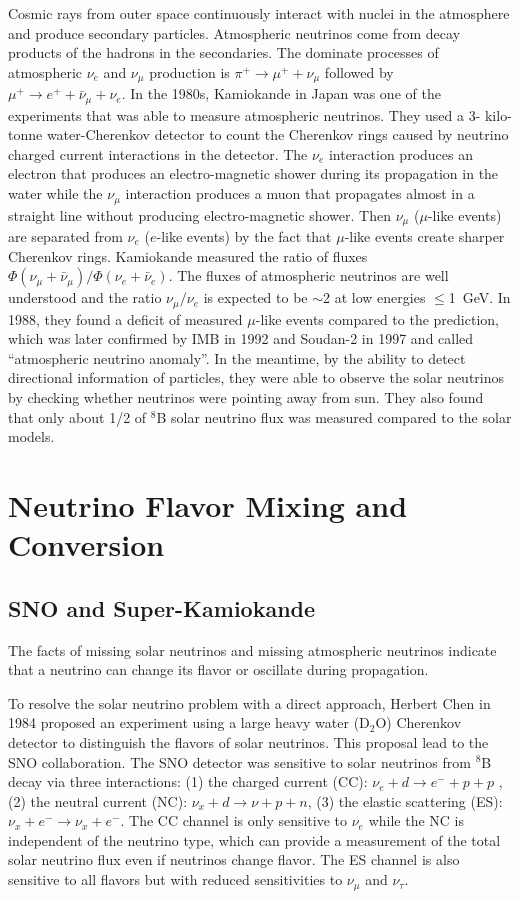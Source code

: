 \documentclass[preprint,12pt]{elsarticle}
\numberwithin{equation}{section}
\begin{document}
Cosmic rays from outer space continuously interact with nuclei in the atmosphere and produce secondary particles. Atmospheric neutrinos come from decay products of the hadrons in the secondaries. The dominate processes of atmospheric $\nu_e$ and $\nu_\mu$ production is $\pi^+\to\mu^+ + \nu_\mu$ followed by $\mu^+ \to e^+ + \bar{\nu}_\mu + \nu_e$. In the 1980s, Kamiokande in Japan was one of the experiments that was able to measure atmospheric neutrinos. They used a 3- kilo-tonne water-Cherenkov detector to count the Cherenkov rings caused by neutrino charged current interactions in the detector. The $\nu_e$ interaction produces an electron that produces an electro-magnetic shower during its propagation in the water while the $\nu_\mu$ interaction produces a muon that propagates almost in a straight line without producing electro-magnetic shower. Then $\nu_\mu$ ($\mu$-like events) are separated from $\nu_e$ ($e$-like events) by the fact that $\mu$-like events create sharper Cherenkov rings. Kamiokande measured the ratio of fluxes $\Phi(\nu_\mu+\bar{\nu}_\mu)/\Phi(\nu_e+\bar{\nu}_e)$. The fluxes of atmospheric neutrinos are well understood and the ratio $\nu_\mu/\nu_e$ is expected to be $\sim$2 at low energies $\leq$1~GeV. In 1988, they found a deficit of measured $\mu$-like events compared to the prediction, which was later confirmed by IMB in 1992\cite{imb} and Soudan-2 in 1997\cite{soudan2} and called ``atmospheric neutrino anomaly''\cite{atmNuReview}. In the meantime, by the ability to detect directional information of particles, they were able to observe the solar neutrinos by checking whether neutrinos were pointing away from sun. They also found that only about 1/2 of $^8$B solar neutrino flux was measured compared to the solar models\cite{kamioII}. 

\section{Neutrino Flavor Mixing and Conversion}
\subsection{SNO and Super-Kamiokande}
The facts of missing solar neutrinos and missing atmospheric neutrinos indicate that a neutrino can change its flavor or oscillate during propagation.

To resolve the solar neutrino problem with a direct approach, Herbert Chen in 1984 proposed an experiment using a large heavy water (D$_2$O) Cherenkov detector to distinguish the flavors of solar neutrinos\cite{herbertChen}. This proposal lead to the SNO collaboration. The SNO detector was sensitive to solar neutrinos from $^8$B decay via three interactions: (1) the charged current (CC): $\nu_e+d\to e^-+p+p$ , (2) the neutral current (NC): $\nu_x+d\to\nu+p+n$, (3) the elastic scattering (ES): $\nu_x+e^-\to \nu_x+e^-$. The CC channel is only sensitive to $\nu_e$ while the NC is independent of the neutrino type, which can provide a measurement of the total solar neutrino flux even if neutrinos change flavor. The ES channel is also sensitive to all flavors but with reduced sensitivities to $\nu_\mu$ and $\nu_\tau$\cite{SNO}.
\end{document}
